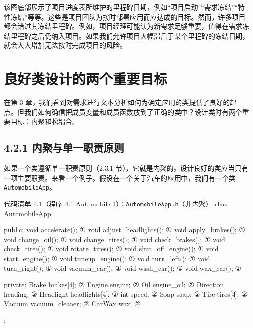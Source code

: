 该图底部展示了项目进度表所维护的里程碑日期，例如“项目启动”“需求冻结”“特性冻结”等等。这些是项目团队为按时部署应用而应达成的目标。然而，许多项目都会错过其冻结里程碑。例如，项目经理可能认为新需求足够重要，值得在需求冻结里程碑之后仍纳入项目。如果我们允许项目大幅滞后于某个里程碑的冻结日期，就会大大增加无法按时完成项目的风险。

\section{良好类设计的两个重要目标}

在第 3 章，我们看到对需求进行文本分析如何为确定应用的类提供了良好的起点。但我们如何确信把成员变量和成员函数放到了正确的类中？设计类时有两个重要目标：内聚和松耦合。

\subsection{4.2.1 内聚与单一职责原则}

如果一个类遵循单一职责原则（2.3.1 节），它就是内聚的。设计良好的类应当只有一项主要职责。来看一个例子。假设在一个关于汽车的应用中，我们有一个类 \texttt{Automobile\allowbreak{}App}。

\begin{codeboxt}{代码清单 4.1（程序 4.1 Automobile-1）：\texttt{Automobile\allowbreak{}App.\allowbreak{}h}（非内聚）}
class AutomobileApp
{
public:
    void accelerate();            ①
    void adjust_headlights();     ①
    void apply_brakes();          ①
    void change_oil();            ①
    void change_tires();          ①
    void check_brakes();          ①
    void check_tires();           ①
    void rotate_tires();          ①
    void shut_off_engine();       ①
    void start_engine();          ①
    void tuneup_engine();         ①
    void turn_left();             ①
    void turn_right();            ①
    void vacuum_car();            ①
    void wash_car();              ①
    void wax_car();               ①

private:
    Brake brakes[4];              ②
    Engine engine;                ②
    Oil engine_oil;               ②
    Direction heading;            ②
    Headlight headlights[4];      ②
    int speed;                    ②
    Soap soap;                    ②
    Tire tires[4];                ②
    Vacuum vacuum_cleaner;        ②
    CarWax wax;                   ②
};
\end{codeboxt}
\par
{}\par

